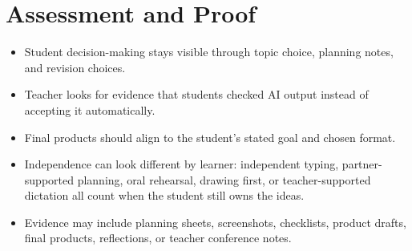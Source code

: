 \documentclass[11pt]{article}
\begin{document}
\section*{Assessment and Proof}
\begin{itemize}
\item Student decision-making stays visible through topic choice, planning notes, and revision choices.
\item Teacher looks for evidence that students checked AI output instead of accepting it automatically.
\item Final products should align to the student's stated goal and chosen format.
\item Independence can look different by learner: independent typing, partner-supported planning, oral rehearsal, drawing first, or teacher-supported dictation all count when the student still owns the ideas.
\item Evidence may include planning sheets, screenshots, checklists, product drafts, final products, reflections, or teacher conference notes.
\end{itemize}
\end{document}

